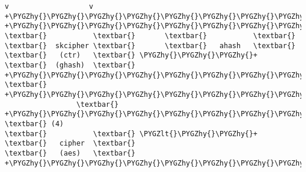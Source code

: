 \documentclass[a4paper,8pt,english]{sphinxmanual}
\def\PYGZlt{\char`\<}
\def\PYGZhy{\char`\-}
\begin{document}
\begin{Verbatim}[commandchars=\\\{\}]
      v                   v
+\PYGZhy{}\PYGZhy{}\PYGZhy{}\PYGZhy{}\PYGZhy{}\PYGZhy{}\PYGZhy{}\PYGZhy{}\PYGZhy{}\PYGZhy{}\PYGZhy{}+       +\PYGZhy{}\PYGZhy{}\PYGZhy{}\PYGZhy{}\PYGZhy{}\PYGZhy{}\PYGZhy{}\PYGZhy{}\PYGZhy{}\PYGZhy{}\PYGZhy{}+
\textbar{}           \textbar{}       \textbar{}           \textbar{}
\textbar{}  skcipher \textbar{}       \textbar{}   ahash   \textbar{}
\textbar{}   (ctr)   \textbar{} \PYGZhy{}\PYGZhy{}\PYGZhy{}+  \textbar{}  (ghash)  \textbar{}
+\PYGZhy{}\PYGZhy{}\PYGZhy{}\PYGZhy{}\PYGZhy{}\PYGZhy{}\PYGZhy{}\PYGZhy{}\PYGZhy{}\PYGZhy{}\PYGZhy{}+    \textbar{}  +\PYGZhy{}\PYGZhy{}\PYGZhy{}\PYGZhy{}\PYGZhy{}\PYGZhy{}\PYGZhy{}\PYGZhy{}\PYGZhy{}\PYGZhy{}\PYGZhy{}+
                 \textbar{}
+\PYGZhy{}\PYGZhy{}\PYGZhy{}\PYGZhy{}\PYGZhy{}\PYGZhy{}\PYGZhy{}\PYGZhy{}\PYGZhy{}\PYGZhy{}\PYGZhy{}+    \textbar{} (4)
\textbar{}           \textbar{} \PYGZlt{}\PYGZhy{}\PYGZhy{}+
\textbar{}   cipher  \textbar{}
\textbar{}   (aes)   \textbar{}
+\PYGZhy{}\PYGZhy{}\PYGZhy{}\PYGZhy{}\PYGZhy{}\PYGZhy{}\PYGZhy{}\PYGZhy{}\PYGZhy{}\PYGZhy{}\PYGZhy{}+
\end{Verbatim}
\end{document}

